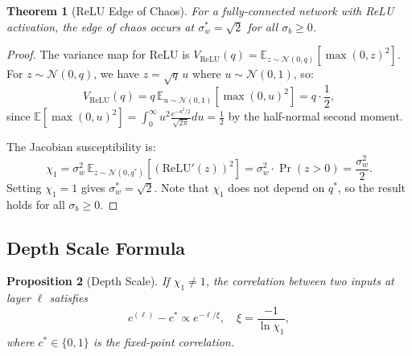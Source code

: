 \documentclass[10pt]{article}
\newtheorem{theorem}{Theorem}[section]
\newtheorem{proposition}[theorem]{Proposition}
\theoremstyle{definition}
\begin{document}
\begin{theorem}[ReLU Edge of Chaos]
\label{thm:relu-eoc}
For a fully-connected network with ReLU activation, the edge of chaos occurs at $\sigma_w^* = \sqrt{2}$ for all $\sigma_b \geq 0$.
\end{theorem}

\begin{proof}
The variance map for ReLU is $V_{\text{ReLU}}(q) = \mathbb{E}_{z \sim \mathcal{N}(0,q)}[\max(0, z)^2]$.
For $z \sim \mathcal{N}(0, q)$, we have $z = \sqrt{q}\, u$ where $u \sim \mathcal{N}(0,1)$, so:
\begin{equation}
  V_{\text{ReLU}}(q) = q \, \mathbb{E}_{u \sim \mathcal{N}(0,1)}[\max(0, u)^2] = q \cdot \frac{1}{2},
\end{equation}
since $\mathbb{E}[\max(0,u)^2] = \int_0^\infty u^2 \frac{e^{-u^2/2}}{\sqrt{2\pi}} du = \frac{1}{2}$ by the half-normal second moment.

The Jacobian susceptibility is:
\begin{equation}
  \chi_1 = \sigma_w^2 \, \mathbb{E}_{z \sim \mathcal{N}(0, q^*)}[(\text{ReLU}'(z))^2] = \sigma_w^2 \cdot \Pr(z > 0) = \frac{\sigma_w^2}{2}.
\end{equation}
Setting $\chi_1 = 1$ gives $\sigma_w^* = \sqrt{2}$.
Note that $\chi_1$ does not depend on $q^*$, so the result holds for all $\sigma_b \geq 0$.
\end{proof}

\subsection{Depth Scale Formula}
\label{app:proof-depth}

\begin{proposition}[Depth Scale]
\label{prop:depth-scale}
If $\chi_1 \neq 1$, the correlation between two inputs at layer $\ell$ satisfies
\begin{equation}
  c^{(\ell)} - c^* \propto e^{-\ell / \xi},
  \quad \xi = \frac{-1}{\ln \chi_1},
\end{equation}
where $c^* \in \{0, 1\}$ is the fixed-point correlation.
\end{proposition}
\end{document}

